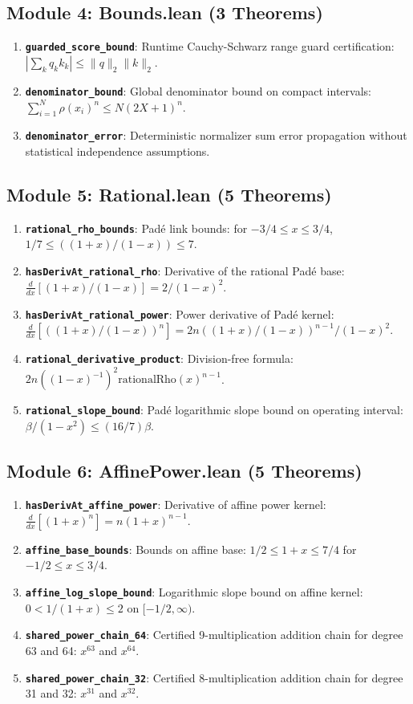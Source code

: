 \documentclass[11pt,a4paper]{article}
\theoremstyle{definition}
\begin{document}
\subsection{Module 4: Bounds.lean (3 Theorems)}
\begin{enumerate}
    \item \textbf{\texttt{guarded\_score\_bound}}: Runtime Cauchy-Schwarz range guard certification: $|\sum_k q_k k_k| \le \|q\|_2 \|k\|_2$.
    \item \textbf{\texttt{denominator\_bound}}: Global denominator bound on compact intervals: $\sum_{i=1}^N \rho(x_i)^n \le N(2X + 1)^n$.
    \item \textbf{\texttt{denominator\_error}}: Deterministic normalizer sum error propagation without statistical independence assumptions.
\end{enumerate}

\subsection{Module 5: Rational.lean (5 Theorems)}
\begin{enumerate}
    \item \textbf{\texttt{rational\_rho\_bounds}}: Padé link bounds: for $-3/4 \le x \le 3/4$, $1/7 \le ((1+x)/(1-x)) \le 7$.
    \item \textbf{\texttt{hasDerivAt\_rational\_rho}}: Derivative of the rational Padé base: $\frac{d}{dx}[(1+x)/(1-x)] = 2/(1-x)^2$.
    \item \textbf{\texttt{hasDerivAt\_rational\_power}}: Power derivative of Padé kernel: $\frac{d}{dx}[((1+x)/(1-x))^n] = 2n ((1+x)/(1-x))^{n-1} / (1-x)^2$.
    \item \textbf{\texttt{rational\_derivative\_product}}: Division-free formula: $2n ((1-x)^{-1})^2 \text{rationalRho}(x)^{n-1}$.
    \item \textbf{\texttt{rational\_slope\_bound}}: Padé logarithmic slope bound on operating interval: $\beta / (1 - x^2) \le (16/7)\beta$.
\end{enumerate}

\subsection{Module 6: AffinePower.lean (5 Theorems)}
\begin{enumerate}
    \item \textbf{\texttt{hasDerivAt\_affine\_power}}: Derivative of affine power kernel: $\frac{d}{dx}[(1+x)^n] = n(1+x)^{n-1}$.
    \item \textbf{\texttt{affine\_base\_bounds}}: Bounds on affine base: $1/2 \le 1+x \le 7/4$ for $-1/2 \le x \le 3/4$.
    \item \textbf{\texttt{affine\_log\_slope\_bound}}: Logarithmic slope bound on affine kernel: $0 < 1/(1+x) \le 2$ on $[-1/2, \infty)$.
    \item \textbf{\texttt{shared\_power\_chain\_64}}: Certified 9-multiplication addition chain for degree 63 and 64: $x^{63}$ and $x^{64}$.
    \item \textbf{\texttt{shared\_power\_chain\_32}}: Certified 8-multiplication addition chain for degree 31 and 32: $x^{31}$ and $x^{32}$.
\end{enumerate}
\end{document}
